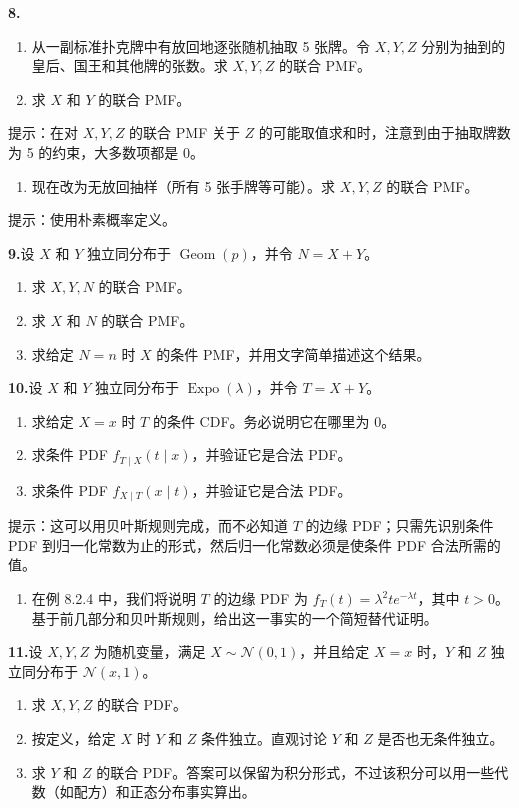 \documentclass[UTF8,12pt,a4paper,fontset=fandol]{ctexart}
\begin{document}
\noindent\textbf{8.}\quad
\begin{enumerate}
  \item[(a)] 从一副标准扑克牌中有放回地逐张随机抽取 5 张牌。令 $X,Y,Z$ 分别为抽到的皇后、国王和其他牌的张数。求 $X,Y,Z$ 的联合 PMF。
  \item[(b)] 求 $X$ 和 $Y$ 的联合 PMF。
\end{enumerate}
提示：在对 $X,Y,Z$ 的联合 PMF 关于 $Z$ 的可能取值求和时，注意到由于抽取牌数为 5 的约束，大多数项都是 $0$。
\begin{enumerate}
  \item[(c)] 现在改为无放回抽样（所有 5 张手牌等可能）。求 $X,Y,Z$ 的联合 PMF。
\end{enumerate}
提示：使用朴素概率定义。

\noindent\textbf{9.}\quad 设 $X$ 和 $Y$ 独立同分布于 $\operatorname{Geom}(p)$，并令 $N=X+Y$。
\begin{enumerate}
  \item[(a)] 求 $X,Y,N$ 的联合 PMF。
  \item[(b)] 求 $X$ 和 $N$ 的联合 PMF。
  \item[(c)] 求给定 $N=n$ 时 $X$ 的条件 PMF，并用文字简单描述这个结果。
\end{enumerate}

\noindent\textbf{10.}\quad 设 $X$ 和 $Y$ 独立同分布于 $\operatorname{Expo}(\lambda)$，并令 $T=X+Y$。
\begin{enumerate}
  \item[(a)] 求给定 $X=x$ 时 $T$ 的条件 CDF。务必说明它在哪里为 $0$。
  \item[(b)] 求条件 PDF $f_{T\mid X}(t\mid x)$，并验证它是合法 PDF。
  \item[(c)] 求条件 PDF $f_{X\mid T}(x\mid t)$，并验证它是合法 PDF。
\end{enumerate}
提示：这可以用贝叶斯规则完成，而不必知道 $T$ 的边缘 PDF；只需先识别条件 PDF 到归一化常数为止的形式，然后归一化常数必须是使条件 PDF 合法所需的值。
\begin{enumerate}
  \item[(d)] 在例 8.2.4 中，我们将说明 $T$ 的边缘 PDF 为 $f_T(t)=\lambda^2te^{-\lambda t}$，其中 $t>0$。基于前几部分和贝叶斯规则，给出这一事实的一个简短替代证明。
\end{enumerate}

\noindent\textbf{11.}\quad 设 $X,Y,Z$ 为随机变量，满足 $X\sim \mathcal{N}(0,1)$，并且给定 $X=x$ 时，$Y$ 和 $Z$ 独立同分布于 $\mathcal{N}(x,1)$。
\begin{enumerate}
  \item[(a)] 求 $X,Y,Z$ 的联合 PDF。
  \item[(b)] 按定义，给定 $X$ 时 $Y$ 和 $Z$ 条件独立。直观讨论 $Y$ 和 $Z$ 是否也无条件独立。
  \item[(c)] 求 $Y$ 和 $Z$ 的联合 PDF。答案可以保留为积分形式，不过该积分可以用一些代数（如配方）和正态分布事实算出。
\end{enumerate}
\end{document}

